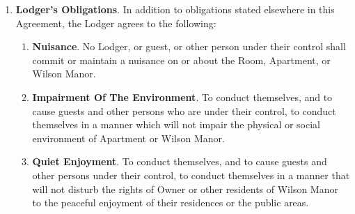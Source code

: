\documentclass[12pt,letterpaper]{article}
\newcommand{\lodger}{Lodger}
\newcommand{\management}{Management}
\newcommand{\condo}{Wilson Manor}
\newcommand{\apt}{Apartment}
\newcommand{\room}{Room}
\begin{document}
\begin{enumerate}
\begin{enumerate}
\begin{enumerate}
						As used throughout this Agreement, ``other person under their control' shall mean any person other than the \lodger{}, or guest, who enters \condo{} property at the express or implied invitation of the \lodger{}, or their guest. 
				\end{enumerate}
			\item \textbf{Criminal Drug Related Activity}. \label{drug}
				No \lodger{}, guest, or other person under their control shall engage in any Drug-Related Criminal Activity on or off the property of \condo{}. As used in this Agreement, ``Drug-Related Criminal Activity' shall mean the illegal manufacture, sale, distribution, use or possession with the intent to manufacture, sell, distribute or use a controlled substance as defined in section 102 of the Controlled Substances Act (21 U.S.C. 802). The \lodger{} specifically understands and acknowledges that: 
				\begin{enumerate}
					\item The \lodger{} has an affirmative obligation to ensure that the \lodger{}, or guest, or other person under their control do not commit any Drug-Related Criminal Activity; 
					\item The \lodger{} shall be held strictly and vicariously liable for any such Drug-Related Criminal Activity which is committed by a guest, or other person under their control; and 
					\item \management{} will terminate this Agreement for any such criminal or illegal act, regardless of whether there is an arrest or a conviction.
				\end{enumerate}
		\end{enumerate}
	\item \textbf{\lodger{}'s Obligations}.
		In addition to obligations stated elsewhere in this Agreement, the \lodger{} agrees to the following: 
		\begin{enumerate}
			\item \textbf{Nuisance}. No \lodger{}, or guest, or other person under their control shall commit or maintain a nuisance on or about the \room{}, \apt{}, or \condo{}. 
			\item \textbf{Impairment Of The Environment}. To conduct themselves, and to cause guests and other persons who are under their control, to conduct themselves in a manner which will not impair the physical or social environment of \apt{} or \condo{}. 
			\item \textbf{Quiet Enjoyment}. To conduct themselves, and to cause guests and other persons under their control, to conduct themselves in a manner that will not disturb the rights of Owner or other residents of \condo{} to the peaceful enjoyment of their residences or the public areas. 

\end{enumerate}
\end{enumerate}
\end{document}
